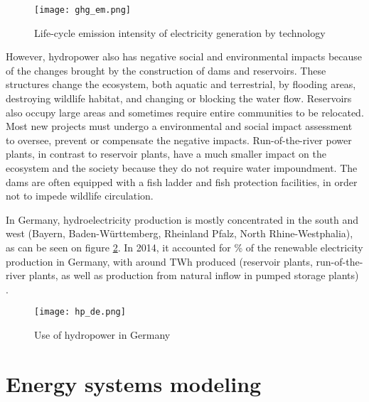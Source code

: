 \begin{figure}[H]
\centering
\texttt{[image: ghg\_em.png]}
\caption[Life-cycle emission intensity of electricity generation by technology]{Life-cycle emission intensity of electricity generation by technology \cite{hp_europe}}
\label{ghg_em}
\end{figure}

However, hydropower also has negative social and environmental impacts because of the changes brought by the construction of dams and reservoirs. These structures change the ecosystem, both aquatic and terrestrial, by flooding areas, destroying wildlife habitat, and changing or blocking the water flow. Reservoirs also occupy large areas and sometimes require entire communities to be relocated. Most new projects must undergo a environmental and social impact assessment to oversee, prevent or compensate the negative impacts. Run-of-the-river power plants, in contrast to reservoir plants, have a much smaller impact on the ecosystem and the society because they do not require water impoundment. The dams are often equipped with a fish ladder and fish protection facilities, in order not to impede wildlife circulation.

In Germany, hydroelectricity production is mostly concentrated in the south and west (Bayern, Baden-Württemberg, Rheinland Pfalz, North Rhine-Westphalia), as can be seen on figure \ref{hp_de}. In 2014, it accounted for \unit[12]{\%} of the renewable electricity production in Germany, with around \unit[20]{TWh} produced (reservoir plants, run-of-the-river plants, as well as production from natural inflow in pumped storage plants) \cite{bdew}.

\begin{figure}[H]
\centering
\texttt{[image: hp\_de.png]}
\caption[Use of hydropower in Germany]{Use of hydropower in Germany \cite{bdew}}
\label{hp_de}
\end{figure}


\section{Energy systems modeling}

